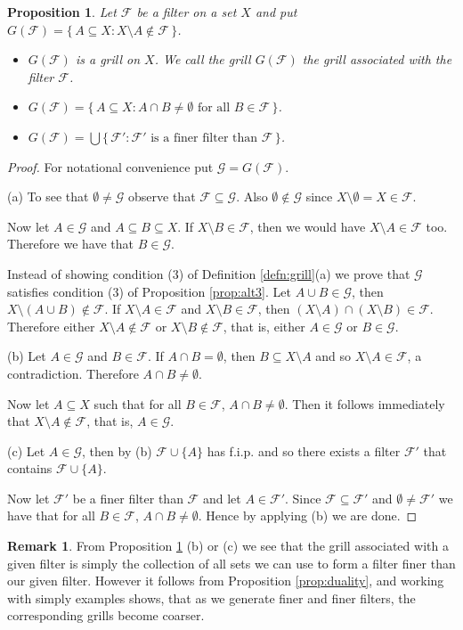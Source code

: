 \documentclass[12pt]{article}
\theoremstyle{plain}
\newtheorem{prop}[thm]{Proposition}
\theoremstyle{definition}
\newtheorem{rmk}[thm]{Remark}
\newcommand{\calF}{\mathcal{F}}
\newcommand{\calG}{\mathcal{G}}
\begin{document}
\begin{prop}
  \label{prop:FltGrl}
  Let $\calF$ be a filter on a set $X$ and put $G(\calF) = \{\, A \subseteq X : X \setminus A \not\in \calF \,\}$.
  \begin{itemize}
    \item[(a)] $G(\calF)$ is a grill on $X$.
      We call the grill $G(\calF)$ the grill \textsl{associated with the filter $\calF$}.
    \item[(b)] $G(\calF) = \{\, A \subseteq X : A \cap B \ne \emptyset \mbox{ for all $B \in \calF$} \,\}$.
    \item[(c)] $G(\calF) = \bigcup\{\, \calF' : \mbox{$\calF'$ is a finer filter than $\calF$} \,\}$.
  \end{itemize}
\end{prop}
\begin{proof}
  For notational convenience put $\calG = G(\calF)$.
 
  (a)
  To see that $\emptyset \ne \calG$ observe that $\calF \subseteq \calG$.
  Also $\emptyset \not\in \calG$ since $X \setminus \emptyset = X \in \calF$.

  Now let $A \in \calG$ and $A \subseteq B \subseteq X$.
  If $X \setminus B \in \calF$, then we would have $X \setminus A \in \calF$ too.
  Therefore we have that $B \in \calG$.

  Instead of showing condition (3) of Definition \ref{defn:grill}(a) we prove that $\calG$ satisfies condition (3) of Proposition \ref{prop:alt3}.
  Let $A \cup B \in \calG$, then $X \setminus (A \cup B) \not\in \calF$.
  If $X \setminus A \in \calF$ and $X \setminus B \in \calF$, then $(X \setminus A) \cap (X \setminus B) \in \calF$.
  Therefore either $X \setminus A \not\in \calF$ or $X \setminus B \not\in \calF$, that is, either $A \in \calG$ or $B \in \calG$.

  (b)
  Let $A \in \calG$ and $B \in \calF$.
  If $A \cap B = \emptyset$, then $B \subseteq X \setminus A$ and so $X \setminus A \in \calF$, a contradiction. 
  Therefore $A \cap B \ne \emptyset$.

  Now let $A \subseteq X$ such that for all $B \in \calF$, $A \cap B \ne \emptyset$.
  Then it follows immediately that $X \setminus A \not\in \calF$, that is, $A \in \calG$.

  (c)
  Let $A \in \calG$, then by (b) $\calF \cup \{A\}$ has f.i.p. and so there exists a filter $\calF'$ that contains $\calF \cup \{A\}$.
  
  Now let $\calF'$ be a finer filter than $\calF$ and let $A \in \calF'$. 
  Since $\calF \subseteq \calF'$ and $\emptyset \ne \calF'$ we have that for all $B \in \calF$, $A \cap B \ne \emptyset$.
  Hence by applying (b) we are done.
\end{proof}
\begin{rmk}
  From Proposition \ref{prop:FltGrl} (b) or (c) we see that the grill associated with a given filter is simply the collection of all sets we can use to form a filter finer than our given filter.
  However it follows from Proposition \ref{prop:duality}, and working with simply examples shows, that as we generate finer and finer filters, the corresponding grills become coarser.
\end{rmk}
\end{document}
